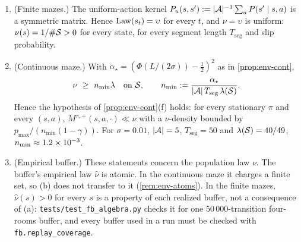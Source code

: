 \begin{proposition}\label{prop:env-replay}
\leavevmode
\begin{enumerate}[nosep,label=(\alph*)]
\item (Finite mazes.) The uniform-action kernel $P_u(s,s'):=\lvert\cA\rvert^{-1}\sum_aP(s'\mid s,a)$ is a symmetric matrix. Hence $\law(s_t)=\upsilon$ for every $t$, and $\nu=\upsilon$ is uniform: $\nu(s)=1/\#\cS>0$ for every state, for every segment length $T_{\mathrm{seg}}$ and slip probability.
\item (Continuous maze.) With $\alpha_\star=(\Phi(L/(2\sigma))-\frac12)^2$ as in \cref{prop:env-cont},
  \[
  \nu\ \ge\ n_{\min}\Leb\quad\text{on }\cS,\qquad n_{\min}:=\frac{\alpha_\star}{\lvert\cA\rvert\,T_{\mathrm{seg}}\,\Leb(\cS)} .
  \]
  Hence the hypothesis of \cref{prop:env-cont}(f) holds: for every stationary $\pi$ and every $(s,a)$, $M^{\pi,+}(s,a,\cdot)\ll\nu$ with a $\nu$-density bounded by $p_{\max}/(n_{\min}(1-\gamma))$.
  For $\sigma=0.01$, $\lvert\cA\rvert=5$, $T_{\mathrm{seg}}=50$ and $\Leb(\cS)=40/49$, $n_{\min}\approx\vn{const.n_min}{1.2\times10^{-3}}$.
\item (Empirical buffer.) These statements concern the population law $\nu$. The buffer's empirical law $\hat\nu$ is atomic. In the continuous maze it charges a finite set, so (b) does not transfer to it (\cref{rem:env-atoms}). In the finite mazes, $\hat\nu(s)>0$ for every $s$ is a property of each realized buffer, not a consequence of (a): \texttt{tests/test\_fb\_algebra.py} checks it for one 50\,000-transition four-rooms buffer, and every buffer used in a run must be checked with \texttt{fb.replay\_coverage}.
\end{enumerate}
\end{proposition}
